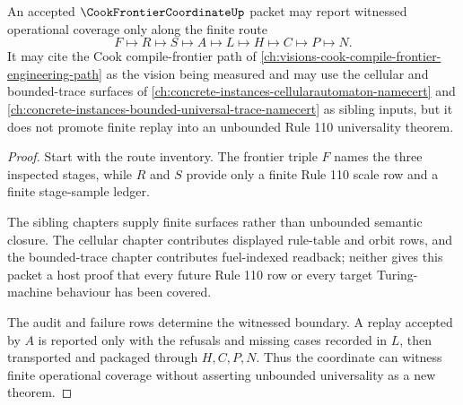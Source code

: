 \begin{theorem}
\label{thm:cook-frontier-coordinate-witnessed-universality-boundary}
An accepted $\CookFrontierCoordinateUp$ packet may report witnessed operational coverage only along the finite route
$$
F \longmapsto R \longmapsto S \longmapsto A \longmapsto L \longmapsto H \longmapsto C \longmapsto P \longmapsto N.
$$
It may cite the Cook compile-frontier path of \autoref{ch:visions-cook-compile-frontier-engineering-path} as the vision being measured and may use the cellular and bounded-trace surfaces of \autoref{ch:concrete-instances-cellularautomaton-namecert} and \autoref{ch:concrete-instances-bounded-universal-trace-namecert} as sibling inputs, but it does not promote finite replay into an unbounded Rule 110 universality theorem.
\end{theorem}
\begin{proof}
Start with the route inventory. The frontier triple $F$ names the three inspected stages, while $R$ and $S$ provide only a finite Rule 110 scale row and a finite stage-sample ledger.

The sibling chapters supply finite surfaces rather than unbounded semantic closure. The cellular chapter contributes displayed rule-table and orbit rows, and the bounded-trace chapter contributes fuel-indexed readback; neither gives this packet a host proof that every future Rule 110 row or every target Turing-machine behaviour has been covered.

The audit and failure rows determine the witnessed boundary. A replay accepted by $A$ is reported only with the refusals and missing cases recorded in $L$, then transported and packaged through $H,C,P,N$. Thus the coordinate can witness finite operational coverage without asserting unbounded universality as a new theorem.
\end{proof}


